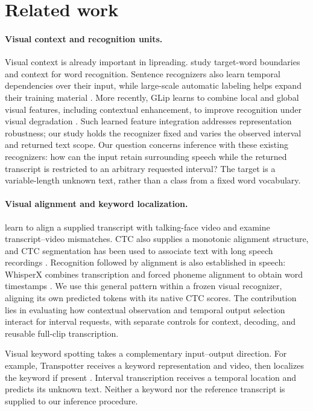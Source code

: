 \section{Related work}

\paragraph{Visual context and recognition units.}
Visual context is already important in lipreading. \citet{stafylakis2018boundaries}
study target-word boundaries and context for word recognition. Sentence recognizers
also learn temporal dependencies over their input, while large-scale automatic
labeling helps expand their training material \citep{ma2023autoavsr,yeo2024vsrlow}.
More recently, GLip learns to combine local and global visual features,
including contextual enhancement, to improve recognition under visual
degradation \citep{wang2025glip}. Such learned feature integration addresses
representation robustness; our study holds the recognizer fixed and varies
the observed interval and returned text scope.
Our question concerns inference with these existing recognizers: how can the
input retain surrounding speech while the returned transcript is restricted to
an arbitrary requested interval? The target is a variable-length unknown text,
rather than a class from a fixed word vocabulary.

\paragraph{Visual alignment and keyword localization.}
\citet{kim2023dvfa} learn to align a supplied transcript with talking-face video
and examine transcript--video mismatches. CTC also supplies a monotonic alignment
structure, and CTC segmentation has been used to associate text with long speech
recordings \citep{graves2006ctc,kurzinger2020segmentation}.
Recognition followed by alignment is also established in speech: WhisperX
combines transcription and forced phoneme alignment to obtain word timestamps
\citep{bain2023whisperx}. We use this general pattern within a frozen visual
recognizer, aligning its own predicted tokens with its native CTC scores.
The contribution lies in evaluating how contextual observation and temporal
output selection interact for interval requests, with separate controls for
context, decoding, and reusable full-clip transcription.

Visual keyword spotting takes a complementary input--output direction.
For example, Transpotter receives a keyword representation and video, then
localizes the keyword if present \citep{prajwal2021transpotter}. Interval
transcription receives a temporal location and predicts its unknown text.
Neither a keyword nor the reference transcript is supplied to our inference
procedure.


